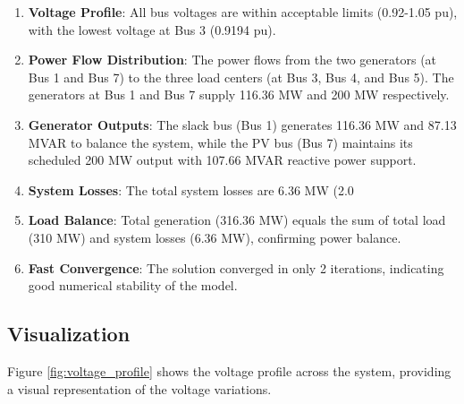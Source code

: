\documentclass{article}
\begin{document}
	\begin{enumerate}
		\item \textbf{Voltage Profile}: All bus voltages are within acceptable limits (0.92-1.05 pu), with the lowest voltage at Bus 3 (0.9194 pu).
		
		\item \textbf{Power Flow Distribution}: The power flows from the two generators (at Bus 1 and Bus 7) to the three load centers (at Bus 3, Bus 4, and Bus 5). The generators at Bus 1 and Bus 7 supply 116.36 MW and 200 MW respectively.
		
		\item \textbf{Generator Outputs}: The slack bus (Bus 1) generates 116.36 MW and 87.13 MVAR to balance the system, while the PV bus (Bus 7) maintains its scheduled 200 MW output with 107.66 MVAR reactive power support.
		
		\item \textbf{System Losses}: The total system losses are 6.36 MW (2.0%
		
		\item \textbf{Load Balance}: Total generation (316.36 MW) equals the sum of total load (310 MW) and system losses (6.36 MW), confirming power balance.
		
		\item \textbf{Fast Convergence}: The solution converged in only 2 iterations, indicating good numerical stability of the model.
	\end{enumerate}
	
	\subsection{Visualization}
	
	Figure \ref{fig:voltage_profile} shows the voltage profile across the system, providing a visual representation of the voltage variations.
	
\end{document}
